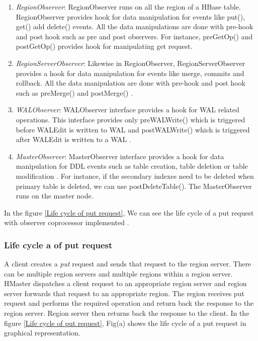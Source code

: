 \documentclass[11pt,a4paper,bibtotoc,idxtotoc,headsepline,footsepline,footexclude,BCOR12mm,DIV13]{scrbook}
\begin{document}
\begin{enumerate}
    
\item \emph{RegionObserver}: RegionObserver runs on all the region of a HBase table. RegionObserver provides hook for data manipulation for events like put(), get() add delete() events. All the data manipulations are done with pre-hook and post hook \cite{hbase:essential} such as pre and post observers. For instance, preGetOp() and postGetOp() provides hook for manipulating get request. 

\item \emph{RegionServerObserver}: Likewise in RegionObserver, RegionServerObserver provides a hook for data manipulation for events like merge, commits and rollback. All the data manipulation are done with pre-hook and post hook such as preMerge() and postMerge() \cite{hbase:essential}. 

\item \emph{WALObserver}: WALObserver interface provides a hook for WAL \cite{hbase:essential} related operations. This interface provides only preWALWrite() which is triggered before WALEdit is written to WAL and postWALWrite() which is triggered after WALEdit is written to a WAL \cite{hbase:essential}.

\item \emph{MasterObserver}: MasterObserver interface provides a hook for data manipulation for DDL events such as table creation, table deletion or table modification \cite{cloudera:instandupg}. For instance, if the secondary indexes need to be deleted when primary table is deleted, we can use postDeleteTable(). The MasterObserver runs on the master node.

\end{enumerate}


In the figure \ref{Life cycle of put request}, We can see the life cycle of a put request with observer coprocessor implemented \cite{coprocessor:detail}.

\subsubsection{Life cycle a of put request}
\label{subsubsec:Life cycle of put request}

A client creates a \emph{put} request and sends that request to the region server. There can be multiple region servers and multiple regions within a region server. HMaster dispatches a client request to an appropriate region server and region server forwards that request to an appropriate region. The region receives put request and performs the required operation and return back the response to the region server. Region server then returns back the response to the client. In the figure \ref{Life cycle of put request}, Fig(a) shows the life cycle of a put request in graphical representation. 
\end{document}
